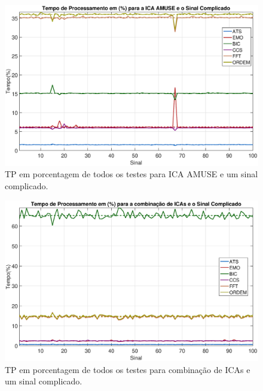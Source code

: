 \documentclass[a4paper,12pt]{monografia}
\theoremstyle{plain}
\theoremstyle{definition}
\theoremstyle{remark}
\begin{document}
\begin{figure}[!htb]
    \begin{center}
    \advance\leftskip -1.5cm
    \includegraphics[scale=0.45]{imagens/ImagensParaOAnexo/TPPEICAAMUSeSinalComplicado.eps}
    \caption{TP em porcentagem de todos os testes para ICA AMUSE e um sinal complicado.}
    \label{fig:TPAMSinalComplicado}    
    \end{center}
\end{figure}

\begin{figure}[!htb]
    \begin{center}
    \advance\leftskip -1.5cm
    \includegraphics[scale=0.45]{imagens/ImagensParaOAnexo/TPPECombinacaoICASinalComplicado.eps}
    \caption{TP em porcentagem de todos os testes para combinação de ICAs  e um sinal complicado.}
    \label{fig:TPCISinalComplicado}    
    \end{center}
\end{figure}
\end{document}
